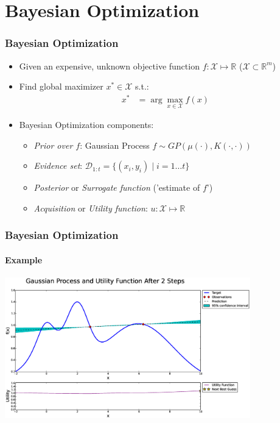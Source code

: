 \section{Bayesian Optimization}

\begin{frame}
\frametitle{Bayesian Optimization}

\begin{itemize}
	\item Given an expensive, unknown objective function $f: \mathcal{X} \mapsto \mathbb{R}$ ($\mathcal{X} \subset \mathbb{R}^m$)
	\pause
	\item Find global maximizer $x^* \in \mathcal{X}$ s.t.:
	\begin{align*}
		x^* &= \arg\max_{x \in \mathcal{X}} f(x)
	\end{align*}
	\pause
	\item Bayesian Optimization components:
	\begin{itemize}
		\pause
		\item \textit{Prior over $f$}: Gaussian Process $f \sim GP(\mu(\cdot), K(\cdot, \cdot))$	%
		\pause
		\item \textit{Evidence set}: $\mathcal{D}_{1:t} = \{(x_i, y_i) \mid i = 1 \ldots t\}$
		\pause
		\item \textit{Posterior} or \textit{Surrogate function} ('estimate of $f$')
		\pause
		\item \textit{Acquisition} or \textit{Utility function}: $u: \mathcal{X} \mapsto \mathbb{R}$ 
	\end{itemize}
\end{itemize}
\end{frame}

\begin{frame}
\frametitle{Bayesian Optimization}
\framesubtitle{Example}

\centering
\includegraphics[width=0.8\textwidth]{figures/bayesian-optimization/fig0}

\end{frame}

